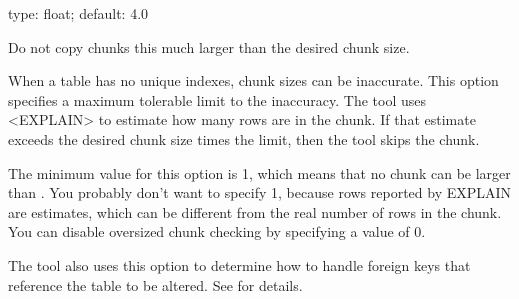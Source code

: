 \documentclass[letterpaper,10pt,english]{sphinxmanual}
\begin{document}
\begin{fulllineitems}
\label{\detokenize{mariadb-schema-change:cmdoption-mariadb-schema-change-chunk-size-limit}}
\sphinxAtStartPar
type: float; default: 4.0

\sphinxAtStartPar
Do not copy chunks this much larger than the desired chunk size.

\sphinxAtStartPar
When a table has no unique indexes, chunk sizes can be inaccurate.  This option
specifies a maximum tolerable limit to the inaccuracy.  The tool uses \textless{}EXPLAIN\textgreater{}
to estimate how many rows are in the chunk.  If that estimate exceeds the
desired chunk size times the limit, then the tool skips the chunk.

\sphinxAtStartPar
The minimum value for this option is 1, which means that no chunk can be larger
than {\hyperref[\detokenize{mariadb-schema-change:cmdoption-mariadb-schema-change-chunk-size}]{}}.  You probably don’t want to specify 1, because rows
reported by EXPLAIN are estimates, which can be different from the real number
of rows in the chunk.  You can disable oversized chunk checking by specifying a
value of 0.

\sphinxAtStartPar
The tool also uses this option to determine how to handle foreign keys that
reference the table to be altered. See {\hyperref[\detokenize{mariadb-schema-change:cmdoption-mariadb-schema-change-alter-foreign-keys-method}]{}} for
details.

\end{fulllineitems}

\end{document}
